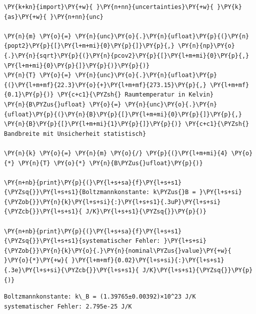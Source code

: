     \begin{tcolorbox}[breakable, size=fbox, boxrule=1pt, pad at break*=1mm,colback=cellbackground, colframe=cellborder]
\begin{Verbatim}[commandchars=\\\{\}]
\PY{k+kn}{import}\PY{+w}{ }\PY{n+nn}{uncertainties}\PY{+w}{ }\PY{k}{as}\PY{+w}{ }\PY{n+nn}{unc}

\PY{n}{m} \PY{o}{=} \PY{n}{unc}\PY{o}{.}\PY{n}{ufloat}\PY{p}{(}\PY{n}{popt2}\PY{p}{[}\PY{l+m+mi}{0}\PY{p}{]}\PY{p}{,} \PY{n}{np}\PY{o}{.}\PY{n}{sqrt}\PY{p}{(}\PY{n}{pcov2}\PY{p}{[}\PY{l+m+mi}{0}\PY{p}{,} \PY{l+m+mi}{0}\PY{p}{]}\PY{p}{)}\PY{p}{)}
\PY{n}{T} \PY{o}{=} \PY{n}{unc}\PY{o}{.}\PY{n}{ufloat}\PY{p}{(}\PY{l+m+mf}{22.3}\PY{o}{+}\PY{l+m+mf}{273.15}\PY{p}{,} \PY{l+m+mf}{0.1}\PY{p}{)} \PY{c+c1}{\PYZsh{} Raumtemperatur in Kelvin}
\PY{n}{B\PYZus{}ufloat} \PY{o}{=} \PY{n}{unc}\PY{o}{.}\PY{n}{ufloat}\PY{p}{(}\PY{n}{B}\PY{p}{[}\PY{l+m+mi}{0}\PY{p}{]}\PY{p}{,} \PY{n}{B}\PY{p}{[}\PY{l+m+mi}{1}\PY{p}{]}\PY{p}{)} \PY{c+c1}{\PYZsh{} Bandbreite mit Unsicherheit statistisch}

\PY{n}{k} \PY{o}{=} \PY{n}{m} \PY{o}{/} \PY{p}{(}\PY{l+m+mi}{4} \PY{o}{*} \PY{n}{T} \PY{o}{*} \PY{n}{B\PYZus{}ufloat}\PY{p}{)}

\PY{n+nb}{print}\PY{p}{(}\PY{l+s+sa}{f}\PY{l+s+s1}{\PYZsq{}}\PY{l+s+s1}{Boltzmannkonstante: k\PYZus{}B = }\PY{l+s+si}{\PYZob{}}\PY{n}{k}\PY{l+s+si}{:}\PY{l+s+s1}{.3uP}\PY{l+s+si}{\PYZcb{}}\PY{l+s+s1}{ J/K}\PY{l+s+s1}{\PYZsq{}}\PY{p}{)}

\PY{n+nb}{print}\PY{p}{(}\PY{l+s+sa}{f}\PY{l+s+s1}{\PYZsq{}}\PY{l+s+s1}{systematischer Fehler: }\PY{l+s+si}{\PYZob{}}\PY{n}{k}\PY{o}{.}\PY{n}{nominal\PYZus{}value}\PY{+w}{ }\PY{o}{*}\PY{+w}{ }\PY{l+m+mf}{0.02}\PY{l+s+si}{:}\PY{l+s+s1}{.3e}\PY{l+s+si}{\PYZcb{}}\PY{l+s+s1}{ J/K}\PY{l+s+s1}{\PYZsq{}}\PY{p}{)}
\end{Verbatim}
\end{tcolorbox}

    \begin{Verbatim}[commandchars=\\\{\}]
Boltzmannkonstante: k\_B = (1.39765±0.00392)×10^23 J/K
systematischer Fehler: 2.795e-25 J/K
    \end{Verbatim}

